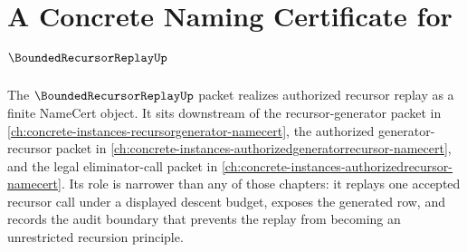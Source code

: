 \chapter{A Concrete Naming Certificate for $\BoundedRecursorReplayUp$}
\label{ch:concrete-instances-boundedrecursorreplay-namecert}

The $\BoundedRecursorReplayUp$ packet realizes authorized recursor replay as a finite NameCert object. It sits downstream of the recursor-generator packet in \autoref{ch:concrete-instances-recursorgenerator-namecert}, the authorized generator-recursor packet in \autoref{ch:concrete-instances-authorizedgeneratorrecursor-namecert}, and the legal eliminator-call packet in \autoref{ch:concrete-instances-authorizedrecursor-namecert}. Its role is narrower than any of those chapters: it replays one accepted recursor call under a displayed descent budget, exposes the generated row, and records the audit boundary that prevents the replay from becoming an unrestricted recursion principle.

